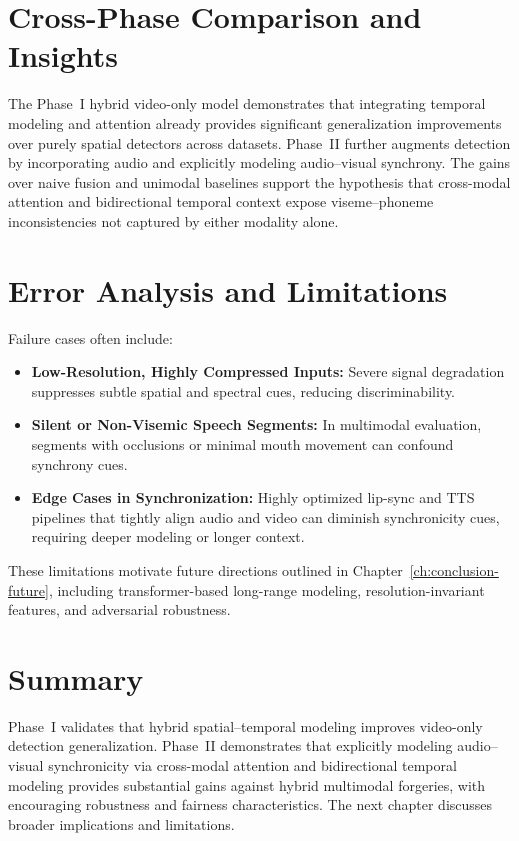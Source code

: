 \section{Cross-Phase Comparison and Insights}
The Phase~I hybrid video-only model demonstrates that integrating temporal modeling and attention already provides significant generalization improvements over purely spatial detectors across datasets. Phase~II further augments detection by incorporating audio and explicitly modeling audio–visual synchrony. The gains over naive fusion and unimodal baselines support the hypothesis that cross-modal attention and bidirectional temporal context expose viseme–phoneme inconsistencies not captured by either modality alone.

\section{Error Analysis and Limitations}
Failure cases often include:
\begin{itemize}
    \item \textbf{Low-Resolution, Highly Compressed Inputs:} Severe signal degradation suppresses subtle spatial and spectral cues, reducing discriminability.
    \item \textbf{Silent or Non-Visemic Speech Segments:} In multimodal evaluation, segments with occlusions or minimal mouth movement can confound synchrony cues.
    \item \textbf{Edge Cases in Synchronization:} Highly optimized lip-sync and TTS pipelines that tightly align audio and video can diminish synchronicity cues, requiring deeper modeling or longer context.
\end{itemize}
These limitations motivate future directions outlined in Chapter~\ref{ch:conclusion-future}, including transformer-based long-range modeling, resolution-invariant features, and adversarial robustness.

\section{Summary}
Phase~I validates that hybrid spatial–temporal modeling improves video-only detection generalization. Phase~II demonstrates that explicitly modeling audio–visual synchronicity via cross-modal attention and bidirectional temporal modeling provides substantial gains against hybrid multimodal forgeries, with encouraging robustness and fairness characteristics. The next chapter discusses broader implications and limitations.